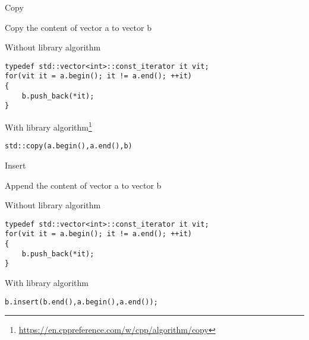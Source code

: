 \documentclass[12pt,t]{beamer}
\begin{document}
\begin{frame}[fragile]{Copy}
\begin{center}
Copy the content of vector a to vector b
\end{center}

\begin{block}{Without library algorithm}
\begin{lstlisting}
typedef std::vector<int>::const_iterator it vit; 
for(vit it = a.begin(); it != a.end(); ++it)
{
	b.push_back(*it);
}
\end{lstlisting}
\end{block}

\begin{block}{With library algorithm\footnote{\tiny\url{https://en.cppreference.com/w/cpp/algorithm/copy}}}
\begin{lstlisting}
std::copy(a.begin(),a.end(),b)
\end{lstlisting}
\end{block}

\end{frame}

\begin{frame}[fragile]{Insert}
\begin{center}
Append the content of vector a to vector b
\end{center}

\begin{block}{Without library algorithm}
\begin{lstlisting}
typedef std::vector<int>::const_iterator it vit; 
for(vit it = a.begin(); it != a.end(); ++it)
{
	b.push_back(*it);
}
\end{lstlisting}
\end{block}

\begin{block}{With library algorithm}
\begin{lstlisting}
b.insert(b.end(),a.begin(),a.end());
\end{lstlisting}
\end{block}

\end{frame}
\end{document}
